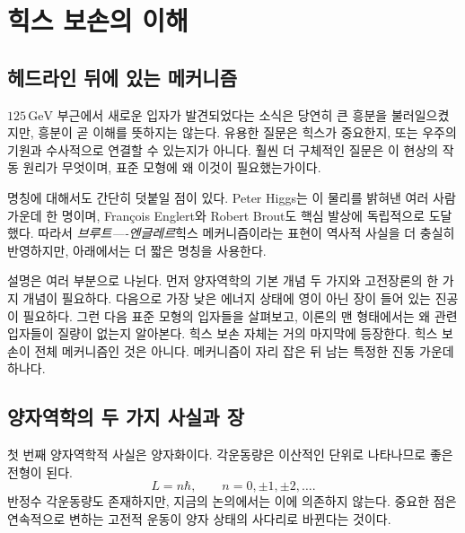 \chapter{힉스 보손의 이해}


\section{헤드라인 뒤에 있는 메커니즘}

$125\,\mathrm{GeV}$ 부근에서 새로운 입자가 발견되었다는 소식은 당연히 큰 흥분을 불러일으켰지만, 흥분이 곧 이해를 뜻하지는 않는다. 유용한 질문은 힉스가 중요한지, 또는 우주의 기원과 수사적으로 연결할 수 있는지가 아니다. 훨씬 더 구체적인 질문은 이 현상의 작동 원리가 무엇이며, 표준 모형에 왜 이것이 필요했는가이다.

명칭에 대해서도 간단히 덧붙일 점이 있다. Peter Higgs는 이 물리를 밝혀낸 여러 사람 가운데 한 명이며, Fran\c{c}ois Englert와 Robert Brout도 핵심 발상에 독립적으로 도달했다. 따라서 \emph{브루트----엔글레르}힉스 메커니즘이라는 표현이 역사적 사실을 더 충실히 반영하지만, 아래에서는 더 짧은 명칭을 사용한다.

설명은 여러 부분으로 나뉜다. 먼저 양자역학의 기본 개념 두 가지와 고전장론의 한 가지 개념이 필요하다. 다음으로 가장 낮은 에너지 상태에 영이 아닌 장이 들어 있는 진공이 필요하다. 그런 다음 표준 모형의 입자들을 살펴보고, 이론의 맨 형태에서는 왜 관련 입자들이 질량이 없는지 알아본다. 힉스 보손 자체는 거의 마지막에 등장한다. 힉스 보손이 전체 메커니즘인 것은 아니다. 메커니즘이 자리 잡은 뒤 남는 특정한 진동 가운데 하나다.

\section{양자역학의 두 가지 사실과 장}

첫 번째 양자역학적 사실은 양자화이다. 각운동량은 이산적인 단위로 나타나므로 좋은 전형이 된다.
\begin{equation}
L=n\hbar,
\qquad
n=0,\pm1,\pm2,\ldots .
\end{equation}
반정수 각운동량도 존재하지만, 지금의 논의에서는 이에 의존하지 않는다. 중요한 점은 연속적으로 변하는 고전적 운동이 양자 상태의 사다리로 바뀐다는 것이다.

